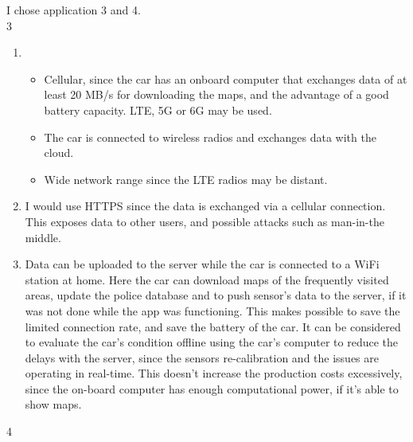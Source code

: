 \documentclass[a4paper, 12pt]{article}
\begin{document}
\begin{exercise}
I chose application 3 and 4.\\
3\\
\begin{enumerate}
    \item 
		\begin{itemize}
		    \item Cellular, since the car has an onboard computer that exchanges
				data of at least 20 MB/s for downloading the maps, and
				the advantage of a good battery capacity. LTE, 5G or 6G may be used.
			\item The car is connected to wireless radios and exchanges data
				with
				the cloud.
			\item Wide network range since the LTE radios may be
				distant.
		\end{itemize}
	\item I would use HTTPS since the data is exchanged via a cellular
		connection. This exposes data to other users, and possible attacks such
		as 
		man-in-the middle.  
	\item Data can be uploaded to the server while the car is connected to a
		WiFi station at home. Here the car can download maps of the
		frequently visited areas, update the police database and to push
		sensor's data to the server, if it was not done while the app was
		functioning.
		This makes possible to save the limited connection rate, and save the
		battery of the car. It can be considered to evaluate the car's condition
		offline using the car's computer to reduce the delays with the server,
		since the sensors re-calibration and the issues are operating in real-time.
		This doesn't increase the production costs excessively, since the
		on-board computer has enough computational power, if it's able to show
		maps.
\end{enumerate}
4\\


\end{exercise}
\end{document}

